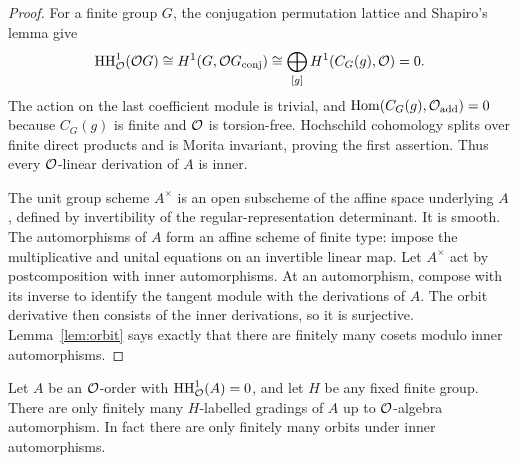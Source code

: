 \begin{proof}
For a finite group $G$, the conjugation permutation lattice and
Shapiro's lemma give
\[
 \operatorname{HH}^1_{\mathcal O}(\mathcal O G)
 \cong H^1(G,\mathcal O G_{\mathrm{conj}})
 \cong\bigoplus_{[g]}H^1(C_G(g),\mathcal O)=0.
\]
The action on the last coefficient module is trivial, and
$\operatorname{Hom}(C_G(g),\mathcal O_{\mathrm{add}})=0$ because $C_G(g)$ is finite
and $\mathcal O$ is torsion-free.  Hochschild cohomology splits over
finite direct products and is Morita invariant, proving the
first assertion.  Thus every $\mathcal O$-linear derivation of $A$ is
inner.

The unit group scheme $A^\times$ is an open subscheme of the
affine space underlying $A$, defined by invertibility of the
regular-representation determinant.  It is smooth.  The
automorphisms of $A$ form an affine scheme of finite type: impose
the multiplicative and unital equations on an invertible linear
map.  Let $A^\times$ act by postcomposition with inner
automorphisms.  At an automorphism, compose with its inverse to
identify the tangent module with the derivations of $A$.
The orbit derivative then consists of the inner derivations,
so it is surjective.  Lemma~\ref{lem:orbit} says exactly that
there are finitely many cosets modulo inner automorphisms.
\end{proof}

\begin{theorem}\label{thm:gradings}
Let $A$ be an $\mathcal O$-order with $\operatorname{HH}^1_{\mathcal O}(A)=0$, and let $H$
be any fixed finite group.  There are only finitely many
$H$-labelled gradings of $A$ up to $\mathcal O$-algebra automorphism.
In fact there are only finitely many orbits under inner
automorphisms.
\end{theorem}

